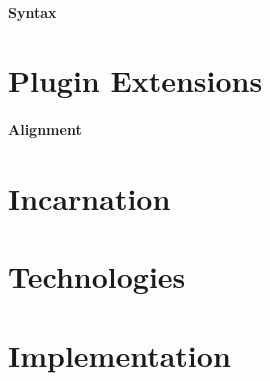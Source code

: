 \paragraph{Syntax}

\section{Plugin Extensions}
\label{sec:plugin-extensions}

\paragraph{Alignment}

\section{Incarnation}
\label{sec:incarnation}


\section{Technologies}
\label{sec:technologies}

\section{Implementation}
\label{sec:implementation}



